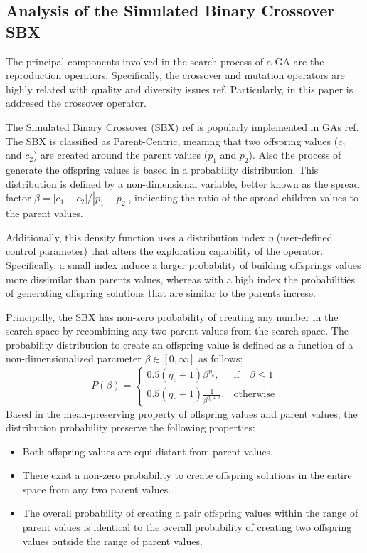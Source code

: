 \subsection{Analysis of the Simulated Binary Crossover SBX}

The principal components involved in the search process of a GA are the reproduction operators.
%
Specifically, the crossover and mutation operators are highly related with quality and diversity issues ref.
%
Particularly, in this paper is addresed the crossover operator.

The Simulated Binary Crossover (SBX) ref is popularly implemented in GAs ref.
%
The SBX is classified as Parent-Centric, meaning that two offspring values ($c_1$ and $c_2$) are created around the parent values ($p_1$ and $p_2$).
%
Also the process of generate the offspring values is based in a probability distribution.
%
This distribution is defined by a non-dimensional variable, better known as the spread factor $\beta = |c_1 - c_2 | / |p_1 - p_2|$, indicating the ratio of the spread children values to the parent values.
%

Additionally, this density function uses a distribution index $\eta$ (user-defined control parameter) that alters the exploration capability of the operator.
%
Specifically, a small index induce a larger probability of building offsprings values more dissimilar than parents values, whereas with a high index the probabilities of generating offspring solutions that are similar to the parents increse.
%

Principally, the SBX has non-zero probability of creating any number in the search space by recombining any two parent values from the search space.
%
The probability distribution to create an offspring value is defined as a function of a non-dimensionalized parameter $\beta \in [0, \infty]$ as follows:
%
\begin{equation}
    P(\beta)= 
\begin{cases}
     0.5(\eta_c + 1)\beta^{\eta_c},& \text{if} \quad \beta \leq 1\\
     0.5(\eta_c + 1) \frac{1}{\beta^{\eta_c + 2}} ,& \text{otherwise}
\end{cases}
\end{equation}
%
Based in the mean-preserving property of offspring values and parent values, the distribution probability preserve the following properties:
\begin{itemize}
\item Both offspring values are equi-distant from parent values.
\item There exist a non-zero probability to create offspring solutions in the entire space  from any two parent values.
\item The overall probability of creating a pair offspring values within the range of parent values is identical to the overall probability of creating two offspring values outside  the range of parent values.
\end{itemize}

